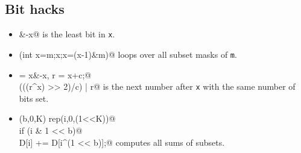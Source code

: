 	\subsection{Bit hacks}
		\begin{itemize}
			\item \verb@x&-x@ is the least bit in \texttt{x}.
			\item \verb@for(int x=m;x;x=(x-1)&m)@ loops over all subset masks of \texttt{m}. 
			\item \verb@c = x&-x, r = x+c;@ \\ \verb@(((r^x) >> 2)/c) | r@ is the next number after \texttt{x} with the same number of bits set.
			\item \verb@rep(b,0,K) rep(i,0,(1<<K))@ \\ \verb@ if (i & 1 << b)@ \\ \verb@ D[i] += D[i^(1 << b)];@ computes all sums of subsets.
		\end{itemize}
